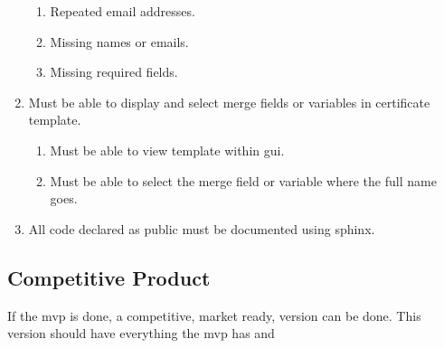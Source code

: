 \documentclass[11pt]{article}
\begin{document}
\begin{enumerate}
\begin{enumerate}
        \item Repeated email addresses.
        \item Missing names or emails.
        \item Missing required fields.
    \end{enumerate}
    \item Must be able to display and select merge fields or variables in certificate template.
    \begin{enumerate}
        \item Must be able to view template within \acrshort{gui}.
        \item Must be able to select the merge field or variable where the full name goes.
    \end{enumerate}
    \item All code declared as public must be documented using \Gls{sphinx}.
\end{enumerate}

\subsection{Competitive Product}

If the \acrshort{mvp} is done, a competitive, market ready, version can be done. This version should have everything the \acrshort{mvp} has and
\end{document}
